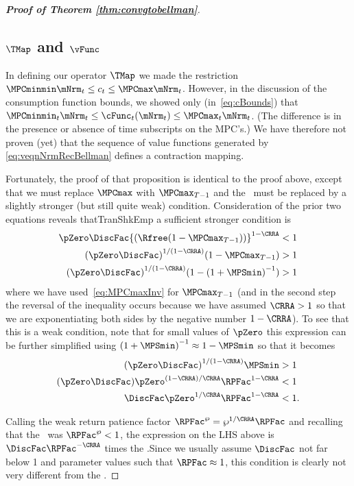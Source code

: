 \documentclass[\econtexRoot/BufferStockTheory]{subfiles}
\begin{document}
\begin{proof}[\textbf{Proof of Theorem \ref{thm:convgtobellman}}]
\subsection{
  \texorpdfstring{$\TMap$}{T} and \texorpdfstring{$\vFunc$}{v}}

In defining our operator $\TMap$ we made the restriction
$\MPCminmin \mNrm_{t} \leq c_{t} \leq \MPCmax \mNrm_{t}$.
However,
in the discussion of the consumption function bounds, we
showed only (in~\eqref{eq:cBounds}) that $\MPCminmin_{t} \mNrm_{t} \leq \cFunc_{t}(\mNrm_{t})
\leq \MPCmax_{t} \mNrm_{t}$.
(The difference is in the presence
or absence of time subscripts on the MPC's.)
We have therefore
not proven (yet) that the sequence of value functions generated by \eqref{eq:veqnNrmRecBellman} defines a contraction mapping.

Fortunately, the proof of that proposition is identical to the proof above, except that we must replace
$\MPCmax$ with $\MPCmax_{T-1}$ and the \WRIC~must be
replaced by a slightly stronger (but still quite weak) condition.
Consideration of the prior two equations reveals thatTranShkEmp
a sufficient stronger condition is
\begin{align*}
  \pZero \DiscFac {(\Rfree (1-\MPCmax_{T-1}))}^{1-\CRRA}  & < 1
  \\  {(\pZero \DiscFac)}^{1/(1-\CRRA)}  (1-\MPCmax_{T-1})  & > 1
  \\  {(\pZero \DiscFac)}^{1/(1-\CRRA)}  (1-{(1+\MPSmin)}^{-1})  & > 1
\end{align*}
where we have used~\eqref{eq:MPCmaxInv} for $\MPCmax_{T-1}$ (and in the second step the reversal of the inequality occurs because we have assumed $\CRRA > 1$ so that we are exponentiating both sides by the negative number $1-\CRRA$).
To see that this is a weak condition, note that for small values of
$\pZero$ this expression can be further simplified using ${(1+\MPSmin)}^{-1}
\approx 1-\MPSmin$ so that it becomes
\begin{align*}
  {(\pZero \DiscFac)}^{1/(1-\CRRA)}  \MPSmin  & > 1
  \\  (\pZero \DiscFac)  \pZero^{(1-\CRRA)/\CRRA} \RPFac^{1-\CRRA}  & < 1
  \\  \DiscFac  \pZero^{1/\CRRA} \RPFac^{1-\CRRA}  & < 1.
\end{align*}

Calling the weak return patience factor $\RPFac^{\wp}=\wp^{1/\CRRA}\RPFac$ and recalling that the \WRIC~was $\RPFac^{\wp}<1$, the expression on the LHS above is $\DiscFac \RPFac^{-\CRRA}$ times the {\WRPFacDefn}.\@ Since we usually assume $\DiscFac$ not far below 1 and parameter values such that $\RPFac \approx 1$, this condition is clearly not very different from the \WRIC.\@


\end{proof}
\end{document}
